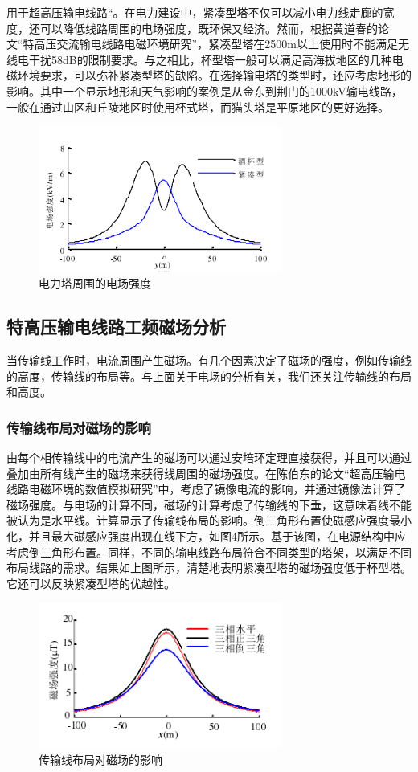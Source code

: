\documentclass{ctexart} %
\begin{document}
用于超高压输电线路“。在电力建设中，紧凑型塔不仅可以减小电力线走廊的宽度，还可以降低线路周围的电场强度，既环保又经济。然而，根据黄道春的论文“特高压交流输电线路电磁环境研究”，紧凑型塔在2500m以上使用时不能满足无线电干扰58dB的限制要求。与之相比，杯型塔一般可以满足高海拔地区的几种电磁环境要求，可以弥补紧凑型塔的缺陷。在选择输电塔的类型时，还应考虑地形的影响。其中一个显示地形和天气影响的案例是从金东到荆门的1000kV输电线路，一般在通过山区和丘陵地区时使用杯式塔，而猫头塔是平原地区的更好选择。

\begin{figure}[htbp]
\small
\centering
\includegraphics[width=8cm]{3.png}
\caption{电力塔周围的电场强度} 
\label{3}
\end{figure}


\subsection{特高压输电线路工频磁场分析}

当传输线工作时，电流周围产生磁场。有几个因素决定了磁场的强度，例如传输线的高度，传输线的布局等。与上面关于电场的分析有关，我们还关注传输线的布局和高度。

\subsubsection{传输线布局对磁场的影响}
	
由每个相传输线中的电流产生的磁场可以通过安培环定理直接获得，并且可以通过叠加由所有线产生的磁场来获得线周围的磁场强度。在陈伯东的论文“超高压输电线路电磁环境的数值模拟研究”中，考虑了镜像电流的影响，并通过镜像法计算了磁场强度。与电场的计算不同，磁场的计算考虑了传输线的下垂，这意味着线不能被认为是水平线。计算显示了传输线布局的影响。倒三角形布置使磁感应强度最小化，并且最大磁感应强度出现在线下方，如图4所示。基于该图，在电源结构中应考虑倒三角形布置。同样，不同的输电线路布局符合不同类型的塔架，以满足不同布局线路的需求。结果如上图所示，清楚地表明紧凑型塔的磁场强度低于杯型塔。它还可以反映紧凑型塔的优越性。
\begin{figure}[htbp]
\small
\centering
\includegraphics[width=8cm]{4.png}
\caption{传输线布局对磁场的影响} 
\label{4}
\end{figure}
\end{document}
